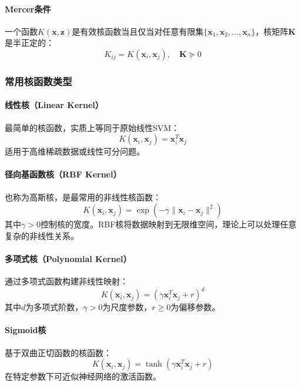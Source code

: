 \documentclass[UTF8]{report}
\theoremstyle{MyLineTheoremStyle} %
\theoremstyle{MyBlockTheoremStyle} %
\theoremstyle{MySubsubsectionStyle} %
\begin{document}
\paragraph{Mercer条件}
一个函数$K(\mathbf{x}, \mathbf{z})$是有效核函数当且仅当对任意有限集$\{\mathbf{x}_1, \mathbf{x}_2, \ldots, \mathbf{x}_n\}$，核矩阵$\mathbf{K}$是半正定的：
\begin{equation}
K_{ij} = K(\mathbf{x}_i, \mathbf{x}_j), \quad \mathbf{K} \succeq 0
\end{equation}

\subsubsection{常用核函数类型}

\paragraph{线性核（Linear Kernel）}
最简单的核函数，实质上等同于原始线性SVM：
\begin{equation}
K(\mathbf{x}_i, \mathbf{x}_j) = \mathbf{x}_i^T \mathbf{x}_j
\end{equation}
适用于高维稀疏数据或线性可分问题。

\paragraph{径向基函数核（RBF Kernel）}
也称为高斯核，是最常用的非线性核函数：
\begin{equation}
K(\mathbf{x}_i, \mathbf{x}_j) = \exp\left(-\gamma \|\mathbf{x}_i - \mathbf{x}_j\|^2\right)
\end{equation}
其中$\gamma > 0$控制核的宽度。RBF核将数据映射到无限维空间，理论上可以处理任意复杂的非线性关系。

\paragraph{多项式核（Polynomial Kernel）}
通过多项式函数构建非线性映射：
\begin{equation}
K(\mathbf{x}_i, \mathbf{x}_j) = (\gamma \mathbf{x}_i^T \mathbf{x}_j + r)^d
\end{equation}
其中$d$为多项式阶数，$\gamma > 0$为尺度参数，$r \geq 0$为偏移参数。

\paragraph{Sigmoid核}
基于双曲正切函数的核函数：
\begin{equation}
K(\mathbf{x}_i, \mathbf{x}_j) = \tanh(\gamma \mathbf{x}_i^T \mathbf{x}_j + r)
\end{equation}
在特定参数下可近似神经网络的激活函数。
\end{document}
